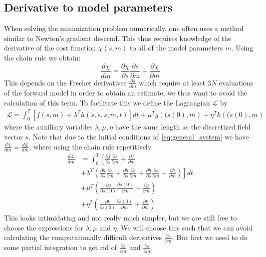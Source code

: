 \documentclass[10pt]{SelfArx} %
\newcommand{\pder}[2][]{\frac{\partial#1}{\partial#2}}
\theoremstyle{definition}
\begin{document}
\subsection{Derivative to model parameters}
 When solving the minimization problem numerically, one often uses a method similar to Newton's gradient descend. This thus requires knowledge of the derivative of the cost function $\chi\left(s,m\right)$ to all of the model parameters $m$. Using the chain rule we obtain:
\begin{equation}\label{eq:derivative_of_chi}
\frac{d\chi}{dm} = \frac{\partial \chi}{\partial s}\frac{\partial s}{\partial m} + \frac{\partial \chi}{\partial m}
\end{equation}
This depends on the Frechet derivatives $\frac{\partial s}{\partial m}$ which require at least $3N$ evaluations of the forward model in order to obtain an estimate, we thus want to avoid the calculation of this term. To facilitate this we define the Lagrangian $\mathcal{L}$ by
\begin{equation}\label{eq:lagrangian}
\begin{aligned}
\mathcal{L} =   \int_0^T \left[f\left(s, m \right) + \lambda^T h\left(\ddot s, \dot s, s, m , t\right)\right] dt 
+ \mu ^T g\left((s\left(0\right), m\right)  + \eta^T k\left((\dot{s}\left(0\right), m\right)
\end{aligned}
\end{equation}
where the auxiliary variables $\lambda, \mu, \eta$ have the same length as the discretized field vector $s$.
Note that due to the initial conditions of~\cref{eq:general_system} we have $\frac{d\chi}{dm} = \frac{d\mathcal{L}}{dm}$, where using the chain rule repetitively 
\begin{equation}\label{eq:lagrangian_derivative_general}
\begin{aligned}
\frac{d\mathcal{L}}{dm} & =  \int_0^T \left[ \pder[f]{s} \pder[s]{m} + \pder[f]{m} \right. \\
& \left. + \lambda^T \left(\pder[h]{\ddot s}\pder[\ddot s]{m} + \pder[h]{\dot s} \pder[\dot s]{m} + \pder[h]{s}\pder[s]{m} + \pder[h]{m}\right) \right]dt  \\
& + \mu^T \left(\pder[g]{s(0)} \pder[s(0)]{m} + \pder[g]{m} \right) \\
& + \eta^T \left(\pder[k]{\dot s(0)} \pder[\dot s(0)]{m} + \pder[k]{m} \right)    
\end{aligned}
\end{equation}
This looks intimidating and not really much simpler, but we are still free to choose the expressions for $\lambda, \mu$ and $\eta$. We will choose this such that we can avoid calculating the computationally difficult derivatives $\pder[s]{m}$. But first we need to do some partial integration to get rid of  $\pder[\dot s]{m}$ and $\pder[\ddot s]{m}$.
\end{document}
